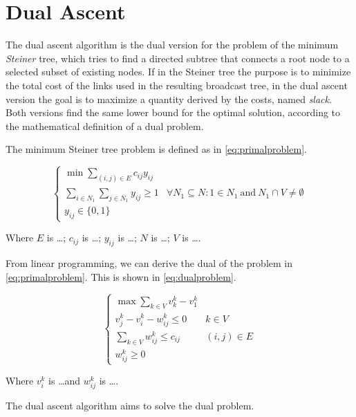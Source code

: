 \chapter{Dual Ascent}\label{ch:dualascent}

The dual ascent algorithm is the dual version for the problem of the minimum
\emph{Steiner} tree, which tries to find a directed subtree that connects a
root node to a selected subset of existing nodes. If in the Steiner tree the
purpose is to minimize the total cost of the links used in the resulting
broadcast tree, in the dual ascent version the goal is to maximize a quantity
derived by the costs, named \emph{slack}. Both versions find the same lower
bound for the optimal solution, according to the mathematical definition of a
dual problem.

The minimum Steiner tree problem is defined as in \eqref{eq:primalproblem}.

\begin{equation}\label{eq:primalproblem}
	\begin{cases}
		\min\sum\limits_{(i,j) \in E} c_{ij}y_{ij}\\
		\sum\limits_{i \in N_1} \sum\limits_{j \in \overline{N_1}}
		y_{ij} \geq 1 & \forall N_1 \subseteq N : 1 \in N_1\
		\mathrm{and}\ N_1 \cap V \neq \emptyset\\
		y_{ij} \in \{0, 1\}
	\end{cases}
\end{equation}

Where \(E\) is \ldots; \(c_{ij}\) is \ldots; \(y_{ij}\) is \ldots; \(N\) is
\ldots; \(V\) is \ldots.

From linear programming, we can derive the dual of the problem in
\eqref{eq:primalproblem}. This is shown in \eqref{eq:dualproblem}.

\begin{equation}\label{eq:dualproblem}
	\begin{cases}
		\max\sum\limits_{k \in V} v_k^k - v_1^k\\
		v_j^k - v_i^k - w_{ij}^k \leq 0 & k \in V\\
		\sum\limits_{k \in V} w_{ij}^k \leq c_{ij} & (i, j) \in E\\
		w_{ij}^k \geq 0
	\end{cases}
\end{equation}

Where \(v_i^k\) is \ldots and \(w_{ij}^k\) is \ldots.

The dual ascent algorithm aims to solve the dual problem.



